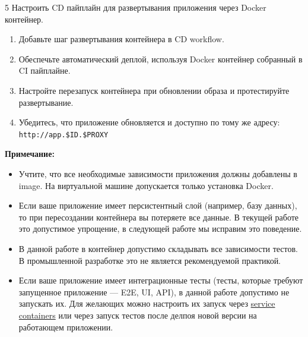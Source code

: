\documentclass[12pt,a4paper]{article}
\begin{document}
\begin{task}{5}
    Настроить CD пайплайн для развертывания приложения через Docker контейнер.

    \begin{enumerate}
        \item Добавьте шаг развертывания контейнера в CD workflow.
        \item Обеспечьте автоматический деплой, используя Docker контейнер собранный в CI пайплайне.
        \item Настройте перезапуск контейнера при обновлении образа и протестируйте развертывание.
        \item Убедитесь, что приложение обновляется и доступно по тому же адресу: \texttt{http://app.\$ID.\$PROXY}
    \end{enumerate}
\end{task}

\textbf{Примечание:}
\begin{itemize}
    \item Учтите, что все необходимые зависимости приложения должны добавлены в image. На виртуальной машине допускается только установка Docker.
    \item Если ваше приложение имеет персистентный слой (например, базу данных), то при пересоздании контейнера вы потеряете все данные. В текущей работе это допустимое упрощение, в следующей работе мы исправим это поведение.
    \item В данной работе в контейнер допустимо складывать все зависимости тестов. В промышленной разработке это не является рекомендуемой практикой.
    \item Если ваше приложение имеет интеграционные тесты (тесты, которые требуют запущенное приложение — E2E, UI, API), в данной работе допустимо не запускать их. Для желающих можно настроить их запуск через \href{https://docs.github.com/en/actions/tutorials/use-containerized-services/use-docker-service-containers}{service containers} или через запуск тестов после делпоя новой версии на работающем приложении.
\end{itemize}
\end{document}
